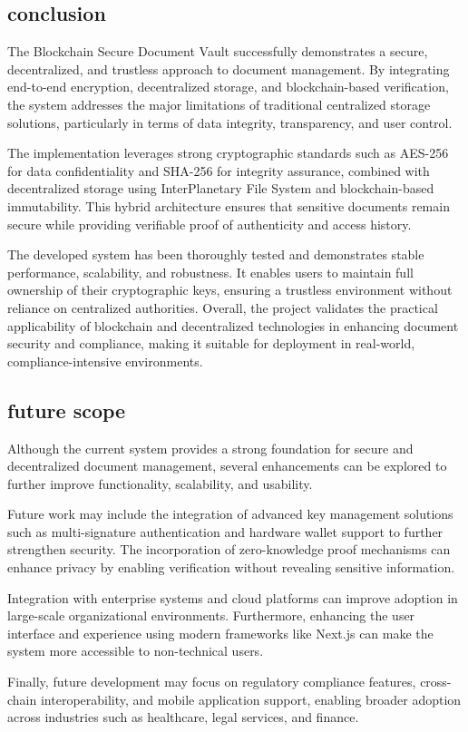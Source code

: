 \documentclass[12pt]{article}
\begin{document}
\subsection{conclusion}
The Blockchain Secure Document Vault successfully demonstrates a secure, decentralized, and trustless approach to document management. By integrating end-to-end encryption, decentralized storage, and blockchain-based verification, the system addresses the major limitations of traditional centralized storage solutions, particularly in terms of data integrity, transparency, and user control.

The implementation leverages strong cryptographic standards such as AES-256 for data confidentiality and SHA-256 for integrity assurance, combined with decentralized storage using InterPlanetary File System and blockchain-based immutability. This hybrid architecture ensures that sensitive documents remain secure while providing verifiable proof of authenticity and access history.

The developed system has been thoroughly tested and demonstrates stable performance, scalability, and robustness. It enables users to maintain full ownership of their cryptographic keys, ensuring a trustless environment without reliance on centralized authorities. Overall, the project validates the practical applicability of blockchain and decentralized technologies in enhancing document security and compliance, making it suitable for deployment in real-world, compliance-intensive environments.

\subsection{future scope}
Although the current system provides a strong foundation for secure and decentralized document management, several enhancements can be explored to further improve functionality, scalability, and usability.

Future work may include the integration of advanced key management solutions such as multi-signature authentication and hardware wallet support to further strengthen security. The incorporation of zero-knowledge proof mechanisms can enhance privacy by enabling verification without revealing sensitive information.

 Integration with enterprise systems and cloud platforms can improve adoption in large-scale organizational environments. Furthermore, enhancing the user interface and experience using modern frameworks like Next.js can make the system more accessible to non-technical users.

Finally, future development may focus on regulatory compliance features, cross-chain interoperability, and mobile application support, enabling broader adoption across industries such as healthcare, legal services, and finance.











\newpage



\end{document}
